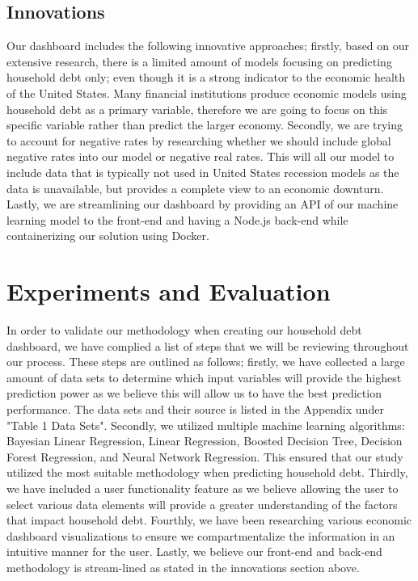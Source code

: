 \documentclass[sigconf,nonacm,11pt]{acmart}
\begin{document}
\subsection{Innovations}

Our dashboard includes the following innovative approaches; firstly, based on our extensive research, there is a limited amount of models focusing on predicting household debt only; even though it is a strong indicator to the economic health of the United States. Many financial institutions produce economic models using household debt as a primary variable, therefore we are going to focus on this specific variable rather than predict the larger economy. Secondly, we are trying to account for negative rates by researching whether we should include global negative rates into our model or negative real rates. This will all our model to include data that is typically not used in United States recession models as the data is unavailable, but provides a complete view to an economic downturn. Lastly, we are streamlining our dashboard by providing an API of our machine learning model to the front-end and having a Node.js back-end while containerizing our solution using Docker.\vspace{-0.5em}

\section{Experiments and Evaluation}
In order to validate our methodology when creating our household debt dashboard, we have complied a list of steps that we will be reviewing throughout our process. These steps are outlined as follows; firstly, we have collected a large amount of data sets to determine which input variables will provide the highest prediction power as we believe this will allow us to have the best prediction performance. The data sets and their source is listed in the Appendix under "Table 1 Data Sets". Secondly, we utilized multiple machine learning algorithms: Bayesian Linear Regression, Linear Regression, Boosted Decision Tree, Decision Forest Regression, and Neural Network Regression. This ensured that our study utilized the most suitable methodology when predicting household debt. Thirdly, we have included a user functionality feature as we believe allowing the user to select various data elements will provide a greater understanding of the factors that impact household debt. Fourthly, we have been researching various economic dashboard visualizations to ensure we compartmentalize the information in an intuitive manner for the user. Lastly, we believe our front-end and back-end methodology is stream-lined as stated in the innovations section above. 
\end{document}
